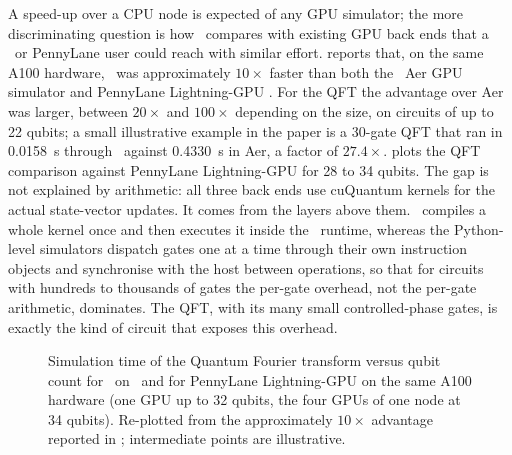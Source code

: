 A speed-up over a CPU node is expected of any GPU simulator; the more discriminating question is how \qgear\ compares with existing GPU back ends that a \qiskit\ or PennyLane user could reach with similar effort. \cite{guo2025qgear} reports that, on the same A100 hardware, \qgear\ was approximately $10\times$ faster than both the \qiskit\ Aer GPU simulator and PennyLane Lightning-GPU \cite{asadi2024pennylanelightning}. For the QFT the advantage over Aer was larger, between $20\times$ and $100\times$ depending on the size, on circuits of up to 22 qubits; a small illustrative example in the paper is a 30-gate QFT that ran in \SI{0.0158}{\second} through \qgear\ against \SI{0.4330}{\second} in Aer, a factor of $27.4\times$.  plots the QFT comparison against PennyLane Lightning-GPU for 28 to 34 qubits. The gap is not explained by arithmetic: all three back ends use cuQuantum kernels for the actual state-vector updates. It comes from the layers above them. \qgear\ compiles a whole kernel once and then executes it inside the \cudaq\ runtime, whereas the Python-level simulators dispatch gates one at a time through their own instruction objects and synchronise with the host between operations, so that for circuits with hundreds to thousands of gates the per-gate overhead, not the per-gate arithmetic, dominates. The QFT, with its many small controlled-phase gates, is exactly the kind of circuit that exposes this overhead.

\begin{figure}[htbp]
\centering
{}
\caption{Simulation time of the Quantum Fourier transform versus qubit count for \qgear\ on \cudaq\ and for PennyLane Lightning-GPU on the same A100 hardware (one GPU up to 32 qubits, the four GPUs of one node at 34 qubits). Re-plotted from the approximately $10\times$ advantage reported in \cite{guo2025qgear}; intermediate points are illustrative.}
\label{fig:qgear:qft}
\end{figure}

